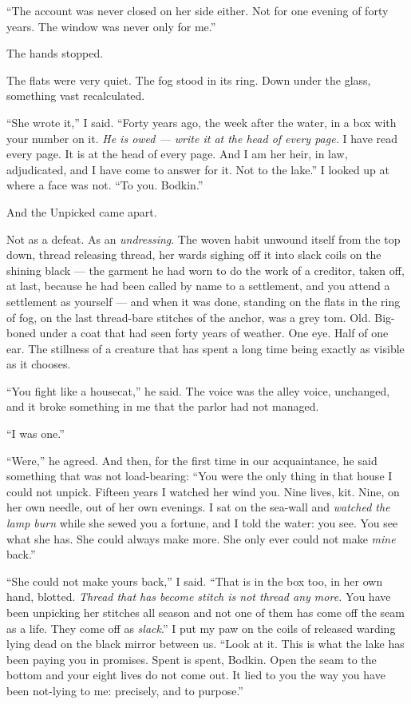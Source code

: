 ``The account was never closed on her side either. Not for one evening of forty years. The window was never only for me.''

The hands stopped.

The flats were very quiet. The fog stood in its ring. Down under the glass, something vast recalculated.

``She wrote it,'' I said. ``Forty years ago, the week after the water, in a box with your number on it. \emph{He is owed --- write it at the head of every page.} I have read every page. It is at the head of every page. And I am her heir, in law, adjudicated, and I have come to answer for it. Not to the lake.'' I looked up at where a face was not. ``To you. Bodkin.''

And the Unpicked came apart.

Not as a defeat. As an \emph{undressing}. The woven habit unwound itself from the top down, thread releasing thread, her wards sighing off it into slack coils on the shining black --- the garment he had worn to do the work of a creditor, taken off, at last, because he had been called by name to a settlement, and you attend a settlement as yourself --- and when it was done, standing on the flats in the ring of fog, on the last thread-bare stitches of the anchor, was a grey tom. Old. Big-boned under a coat that had seen forty years of weather. One eye. Half of one ear. The stillness of a creature that has spent a long time being exactly as visible as it chooses.

``You fight like a housecat,'' he said. The voice was the alley voice, unchanged, and it broke something in me that the parlor had not managed.

``I was one.''

``Were,'' he agreed. And then, for the first time in our acquaintance, he said something that was not load-bearing: ``You were the only thing in that house I could not unpick. Fifteen years I watched her wind you. Nine lives, kit. Nine, on her own needle, out of her own evenings. I sat on the sea-wall and \emph{watched the lamp burn} while she sewed you a fortune, and I told the water: you see. You see what she has. She could always make more. She only ever could not make \emph{mine} back.''

``She could not make yours back,'' I said. ``That is in the box too, in her own hand, blotted. \emph{Thread that has become stitch is not thread any more.} You have been unpicking her stitches all season and not one of them has come off the seam as a life. They come off as \emph{slack}.'' I put my paw on the coils of released warding lying dead on the black mirror between us. ``Look at it. This is what the lake has been paying you in promises. Spent is spent, Bodkin. Open the seam to the bottom and your eight lives do not come out. It lied to you the way you have been not-lying to me: precisely, and to purpose.''

